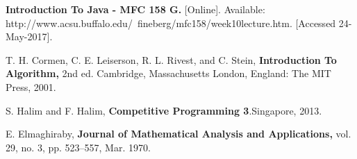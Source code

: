 \begin{thebibliography}{9}
	
	\textbf{Introduction To Java - MFC 158 G.} [Online]. Available: http://www.acsu.buffalo.edu/~fineberg/mfc158/week10lecture.htm. [Accessed 24-May-2017].		
	
	T. H. Cormen, C. E. Leiserson, R. L. Rivest, and C. Stein,
	\textbf{Introduction To Algorithm,} 2nd ed. Cambridge, Massachusetts London, England: The MIT Press, 2001.
	
	S. Halim and F. Halim,
	\textbf{ Competitive Programming 3}.Singapore, 2013.
	
	E. Elmaghiraby, \textbf{Journal of Mathematical Analysis and Applications,} vol. 29, no. 3, pp. 523–557, Mar. 1970.
		
\end{thebibliography}
